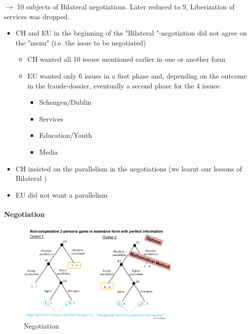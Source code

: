 $\rightarrow$ 10 subjects of Bilateral  negotiations. Later
reduced to 9, Liberization of services was dropped.


\begin{itemize}
    \item CH and EU in the beginning of the "Bilateral "-negotiation
        did not agree on the "menu" (i.e. the issue to be negotiated)
        \begin{itemize}
            \item CH wanted all 10 issues mentioned earlier in one or another form
            \item EU wanted only 6 issues in a first phase and, depending on the
                outcome in the fraude-dossier, eventually a second phase for the
                4 issues:
                \begin{itemize}
                    \item Schengen/Dublin
                    \item Services
                    \item Education/Youth
                    \item Media
                \end{itemize}
        \end{itemize}
    \item CH insisted on the parallelism in the negotiations (we learnt our
        lessons of Bilateral )
    \item EU did not want a parallelism
\end{itemize}

\paragraph{Negotiation}

\begin{figure}[H]
    \centering
    \includegraphics[width=0.7\textwidth]{Pictures/Bilateral_2_negotiation.png}
    \caption{Negotiation}
\end{figure}

